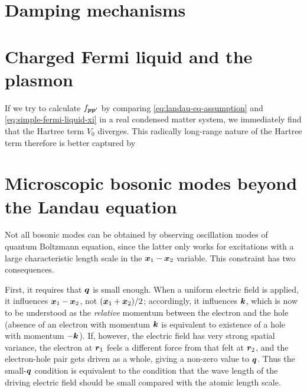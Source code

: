 \documentclass[hyperref, a4paper]{article}
\begin{document}
\section{Damping mechanisms}



\section{Charged Fermi liquid and the plasmon}\label{sec:charged-fermi-liquid}

If we try to calculate $f_{\vb*{p} \vb*{p}'}$ by 
comparing \eqref{eq:landau-eq-assumption} and \eqref{eq:simple-fermi-liquid-xi}
in a real condensed matter system,
we immediately find that the Hartree term $V_0$ diverges.
This radically long-range nature of the Hartree term therefore 
is better captured by 

\section{Microscopic bosonic modes beyond the Landau equation}\label{sec:microscopic-bosonic-modes}

Not all bosonic modes can be obtained 
by observing oscillation modes of quantum Boltzmann equation,
since the latter only works for 
excitations with a large characteristic length scale 
in the $\vb*{x}_1 - \vb*{x}_2$ variable.
This constraint has two consequences.

First, it requires that $\vb*{q}$ is small enough.
When a uniform electric field is applied, 
it influences $\vb*{x}_1 - \vb*{x}_2$, not $(\vb*{x}_1 + \vb*{x}_2) / 2$;
accordingly, it influences $\vb*{k}$, 
which is now to be understood as the \emph{relative} momentum 
between the electron and the hole 
(absence of an electron with momentum $\vb*{k}$ 
is equivalent to existence of a hole with momentum $- \vb*{k}$).
If, however, the electric field has very strong spatial variance, 
the electron at $\vb*{r}_1$ feels a different force 
from that felt at $\vb*{r}_2$,
and the electron-hole pair gets driven as a whole,
giving a non-zero value to $\vb*{q}$.
Thus the small-$\vb*{q}$ condition is equivalent to 
the condition that the wave length of the driving electric field 
should be small compared with the atomic length scale.
\end{document}
